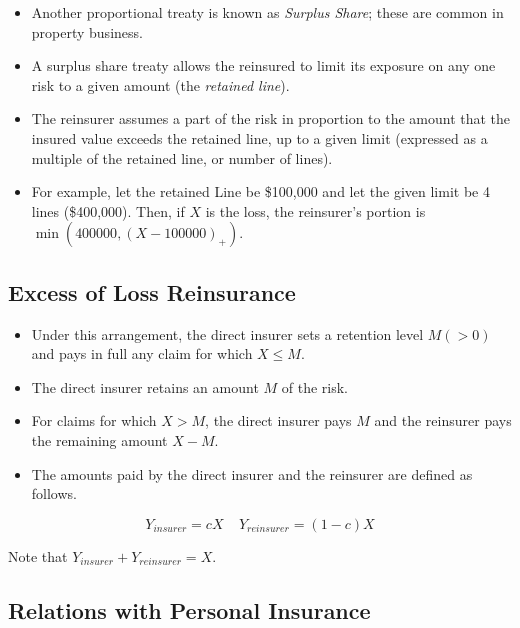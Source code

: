 \documentclass[]{book}
\begin{document}
\begin{itemize}
\item
  Another proportional treaty is known as \emph{Surplus Share}; these
  are common in property business.
\item
  A surplus share treaty allows the reinsured to limit its exposure on
  any one risk to a given amount (the \emph{retained line}).
\item
  The reinsurer assumes a part of the risk in proportion to the amount
  that the insured value exceeds the retained line, up to a given limit
  (expressed as a multiple of the retained line, or number of lines).
\item
  For example, let the retained Line be \$100,000 and let the given
  limit be 4 lines (\$400,000). Then, if \(X\) is the loss, the
  reinsurer's portion is \(\min(400000, (X-100000)_+)\).
\end{itemize}

\subsection{Excess of Loss
Reinsurance}\label{excess-of-loss-reinsurance}

\begin{itemize}
\item
  Under this arrangement, the direct insurer sets a retention level
  \(M (>0)\) and pays in full any claim for which \(X \le M\).
\item
  The direct insurer retains an amount \(M\) of the risk.
\item
  For claims for which \(X > M\), the direct insurer pays \(M\) and the
  reinsurer pays the remaining amount \(X-M\).
\item
  The amounts paid by the direct insurer and the reinsurer are defined
  as follows.
\end{itemize}

\begin{equation*}
Y_{insurer} = c X \ \ \ \ \ Y_{reinsurer} = (1-c) X
\end{equation*}

Note that \(Y_{insurer}+Y_{reinsurer}=X\).

\subsection{Relations with Personal
Insurance}\label{relations-with-personal-insurance}
\end{document}
